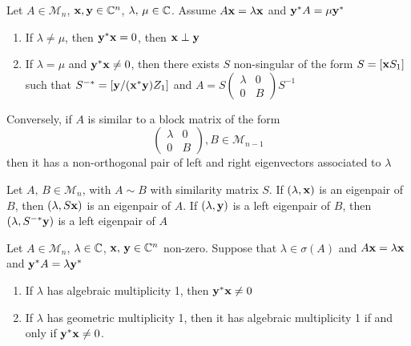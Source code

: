 \documentclass[aspectratio=169]{beamer}
\begin{document}
\begin{frame}
\begin{theorem}
Let $A\in \mathcal{M}_n$, $\mathbf{x},\mathbf{y}\in \mathbb{C}^n$, $\lambda,\, \mu\in \mathbb{C}$. Assume $A\mathbf{x}= \lambda\mathbf{x}$ and $\mathbf{y}^*A= \mu \mathbf{y}^*$
\begin{enumerate}
\item If $\lambda\neq \mu$, then $\mathbf{y}^*\mathbf{x}=0$, then $\mathbf{x} \perp \mathbf{y}$
\item If $\lambda= \mu$ and $\mathbf{y}^* \mathbf{x} \neq0$, then there exists $S$ non-singular of the form $S= [\mathbf{x} S_1]$ such that $S^{-*}= [\mathbf{y} / (\mathbf{x}^{*}\mathbf{y}) Z_1]$
and $A=S \begin{pmatrix}
\lambda &0\\
0& B
\end{pmatrix}S^{-1}$
\end{enumerate}

Conversely, if $A$ is similar to a block matrix of the form 
\[
  \begin{pmatrix}
  \lambda &0\\
  0& B
  \end{pmatrix}, B\in \mathcal{M}_{n-1}
\]
then it has a non-orthogonal pair of left and right eigenvectors associated to $\lambda$
\end{theorem}
\end{frame}

\begin{frame}
\begin{theorem}\label{th:A_B_similar_consequences_eigenpairs}
Let $A,\, B\in \mathcal{M}_n$, with $A\sim B$ with similarity matrix $S$. If $(\lambda, \mathbf{x})$ is an eigenpair of $B$, then $(\lambda, S\mathbf{x})$ is an eigenpair of $A$. If $(\lambda, \mathbf{y})$ is a left eigenpair of $B$, then $(\lambda, S^{-*}\mathbf{y})$ is a left eigenpair of $A$ 
\end{theorem}
\begin{theorem}\label{th:algebrair_geom_mult}
Let $A\in \mathcal{M}_n$, $\lambda\in \mathbb{C}$, $\mathbf{x},\, \mathbf{y}\in \mathbb{C}^n$ non-zero. Suppose that $\lambda\in \sigma(A)$ and $A\mathbf{x}=\lambda \mathbf{x}$ and $\mathbf{y}^{*} A= \lambda \mathbf{y}^*$
\begin{enumerate}
\item If $\lambda$ has algebraic multiplicity 1, then $\mathbf{y}^{*}\mathbf{x}\neq 0 $
\item If $\lambda$ has geometric multiplicity 1, then it has algebraic multiplicity 1 if and only if $\mathbf{y}^{*} \mathbf{x}\neq 0$. 
\end{enumerate}
\end{theorem}
\end{frame}
\end{document}

